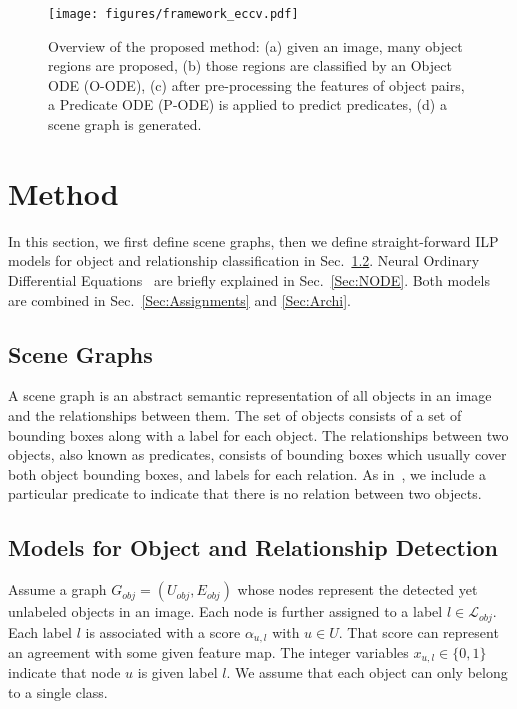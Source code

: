\documentclass[runningheads]{llncs}
\newcommand{\cL}{\mathcal{L}}
\begin{document}
\begin{figure*}[ht!]
\centering
\texttt{[image: figures/framework\_eccv.pdf]}
\caption{Overview of the proposed method: (a) given an image, many object regions are proposed, (b) those regions are classified by an Object ODE (O-ODE), (c) after pre-processing the features of object pairs, a Predicate ODE (P-ODE) is applied to predict predicates, (d) a scene graph is generated.}
\label{fig:model}
\end{figure*}  

\section{Method} 
\label{Sec:method}

In this section, we first define scene graphs, then we define straight-forward ILP models for object and relationship classification in Sec.~\ref{Sec:VRD.ILP}. Neural Ordinary Differential Equations~\cite{Chen2018:NODE} are briefly explained in Sec.~\ref{Sec:NODE}. Both models are combined in Sec.~\ref{Sec:Assignments} and \ref{Sec:Archi}. 













\subsection{Scene Graphs}
A scene graph \cite{johnson2015image} is an abstract semantic representation of all objects in an image and the relationships between them. 
The set of objects consists of a set of bounding boxes along with a label for each object. The relationships between two objects, also known as predicates, consists of bounding boxes which usually cover both object bounding boxes, and labels for each relation. As in~\cite{zellers2018neural}, we include a particular predicate to indicate that there is no relation between two objects. 






\subsection{Models for Object and Relationship Detection}
\label{Sec:VRD.ILP}
Assume a graph $G_{obj}=(U_{obj},E_{obj})$ whose nodes represent the detected yet unlabeled objects in an image. Each node is further assigned to a label $l \in \cL_{obj}$. Each label $l$ is associated with a score $\alpha_{u,l}$ with $u \in U$. That score can represent an agreement with some given feature map. 
The integer variables $x_{u,l} \in \{0,1\}$ indicate that node $u$ is given label $l$. We assume that each object can only belong to a single class.
\end{document}
